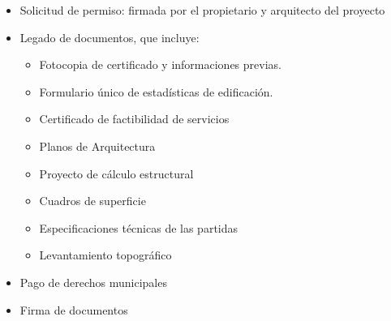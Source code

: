 \documentclass{article} %
\begin{document}
\begin{itemize}[label={},left=0pt,align=parleft]
    \item \begin{highlightbox}[levelone] Solicitud de permiso: firmada por el propietario y arquitecto del proyecto \end{highlightbox}
    \item \begin{highlightbox}[levelone] Legado de documentos, que incluye: \end{highlightbox}
    \begin{itemize}[label={},left=1em,align=parleft]
        \item \begin{highlightbox}[leveltwo] Fotocopia de certificado y informaciones previas. \end{highlightbox}
        \item \begin{highlightbox}[leveltwo] Formulario único de estadísticas de edificación. \end{highlightbox}
        \item \begin{highlightbox}[leveltwo] Certificado de factibilidad de servicios \end{highlightbox}
        \item \begin{highlightbox}[leveltwo] Planos de Arquitectura \end{highlightbox}
        \item \begin{highlightbox}[leveltwo] Proyecto de cálculo estructural \end{highlightbox}
        \item \begin{highlightbox}[leveltwo] Cuadros de superficie \end{highlightbox}
        \item \begin{highlightbox}[leveltwo] Especificaciones técnicas de las partidas \end{highlightbox}
        \item \begin{highlightbox}[leveltwo] Levantamiento topográfico \end{highlightbox}
    \end{itemize}
    \item \begin{highlightbox}[levelone] Pago de derechos municipales \end{highlightbox}
    \item \begin{highlightbox}[levelone] Firma de documentos \end{highlightbox}
\end{itemize}
\end{document}
